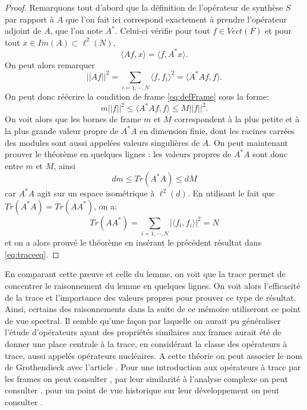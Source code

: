 	\begin{proof}
		Remarquons tout d'abord que la définition de l'opérateur de synthèse $S$ par rapport à $A$ que l'on fait ici correspond exactement à prendre l'opérateur adjoint de $A$, que l'on note $A^*$.
		Celui-ci vérifie pour tout $f\in Vect(F)$ et pour tout $x\in Im(A) \subset \ell^2(N)$,
		\begin{equation}
			\langle Af, x \rangle = \langle f, A^*x \rangle.
		\end{equation}
		On peut alors remarquer
		\begin{equation}
			||Af||^2 = \sum_{i=1, \cdots,N} \langle f, f_i \rangle^2 = \langle A^*Af, f\rangle.
		\end{equation}
		On peut donc réécrire la condition de frame \ref{eq:defFrame} sous la forme:
		\begin{equation}
			m||f||^2 \leq \langle A^*Af, f\rangle \leq M||f||^2.
		\end{equation}
		On voit alors que les bornes de frame $m$ et $M$ correspondent à la plus petite et à la plus grande valeur propre de $A^*A$ en dimension finie, dont les racines carrées des modules sont aussi appelées valeurs singulières de $A$.
		\newline
		On peut maintenant prouver le théorème en quelques lignes : les valeurs propres de $A^*A$ sont donc entre $m$ et $M$, ainsi
		\begin{equation}\label{eq:traceeq}
			dm \leq Tr(A^*A) \leq dM
		\end{equation}
		car $A^*A$ agit sur un espace isométrique à $\ell^2(d)$.
		En utilisant le fait que $Tr(A^*A) = Tr(AA^*)$, on a:
		\begin{equation}
			Tr(AA^*) = \sum_{i=1,\cdots, N} |\langle f_i, f_i \rangle|^2 = N
		\end{equation}
		et on a alors prouvé le théorème en insérant le précédent résultat dans \ref{eq:traceeq}.  	
	\end{proof}	
	En comparant cette preuve et celle du lemme, on voit que la trace permet de concentrer le raisonnement du lemme en quelques lignes.
	On voit alors l'efficacité de la trace et l'importance des valeurs propres pour prouver ce type de résultat.
	Ainsi, certains des raisonnements dans la suite de ce mémoire utiliseront ce point de vue spectral.
	\newline
	Il semble qu'une façon par laquelle on aurait pu généraliser l'étude d'opérateurs ayant des propriétés similaires aux frames aurait été de donner une place centrale à la trace, en considérant la classe des opérateurs à trace, aussi appelés opérateurs nucléaires.
	A cette théorie on peut associer le nom de Grothendieck avec l'article \cite{groth}. 
	Pour une introduction aux opérateurs à trace par les frames on peut consulter \cite{traceclass}, par leur similarité à l'analyse complexe on peut consulter \cite{acQuef}, pour un point de vue historique sur leur développement on peut consulter \cite{surlestraces}. 
